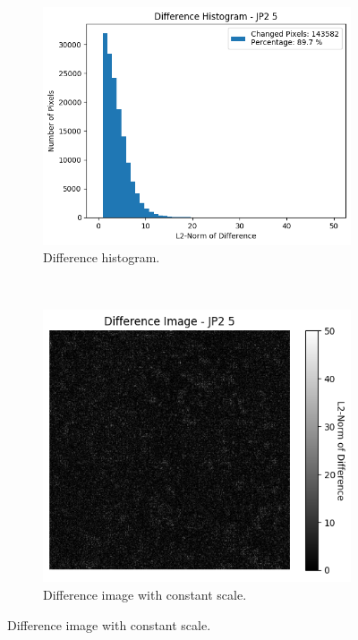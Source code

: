 \begin{figure}[htb]
\begin{subfigure}[b]{0.48\textwidth}
        \includegraphics[width=\textwidth]{doc/thesis/0_figures/compare_quality/set1/jp2_5_center_diff_histogram.png}
        \caption{Difference histogram.}
        \label{fig:img_quality_comp_jp2_5_center_histo}
    \end{subfigure}
    \\
    \begin{subfigure}[b]{0.48\textwidth}
        \centering
        \includegraphics[width=\textwidth]{doc/thesis/0_figures/compare_quality/set1/jp2_5_center_diff_heatmap.png}
        \caption{Difference image with constant scale.}

\end{subfigure}
\end{figure}
